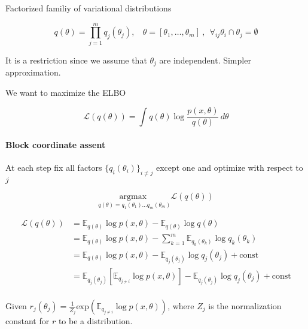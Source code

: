 
Factorized familiy of variational distributions

\begin{equation}
  q(\theta) = \prod_{j=1}^m q_j(\theta_j), \ \ \ \ \theta = [\theta_1, \dots, \theta_m] \ , \ \  \forall_{ij} \theta_i \cap \theta_j = \emptyset
 \end{equation}
 
 It is a restriction since we assume that $\theta_j$ are independent.
 Simpler approximation.
 
 \vspace{0.3cm}
 
 We want to maximize the ELBO
 
 \begin{equation}
 \mathcal{L}(q(\theta)) = \int q(\theta) \log \frac{p(x,\theta)}{q(\theta)} \, d\theta
 \end{equation}

 \begin{framed}
 \paragraph{Block coordinate assent}
 
 At each step fix all factors $\{q_i(\theta_i) \}_{i\neq j}$ except one and optimize with respect to $j$
 
 \begin{equation}
   \underset{q(\theta) = q_1(\theta_1) \dots q_m(\theta_m) }{\text{argmax }} \mathcal{L}(q(\theta))
 \end{equation}
\end{framed}


\begin{equation}
 \begin{split}
  \mathcal{L}(q(\theta)) &= \mathbb{E}_{q(\theta)} \log p(x,\theta) - \mathbb{E}_{q(\theta)} \log q(\theta) \\
  & = \mathbb{E}_{q(\theta)} \log p(x,\theta) -  \sum_{k=1}^m \mathbb{E}_{q_k(\theta_k)} \log q_k(\theta_k) \\
  & = \mathbb{E}_{q(\theta)} \log p(x,\theta) -  \mathbb{E}_{q_j(\theta_j)} \log q_j(\theta_j) + \text{const} \\
  & = \mathbb{E}_{q_j(\theta_j)}[ \mathbb{E}_{q_{j\neq i}} \log p(x,\theta)] -  \mathbb{E}_{q_j(\theta_j)} \log q_j(\theta_j) + \text{const} \\
 \end{split}
\end{equation}

Given $r_j(\theta_j) = \frac{1}{Z_j} \text{exp}(\mathbb{E}_{q_{j\neq i}} \log p(x,\theta))$, where $Z_j$ is the normalization constant for $r$ to be a distribution.
 
